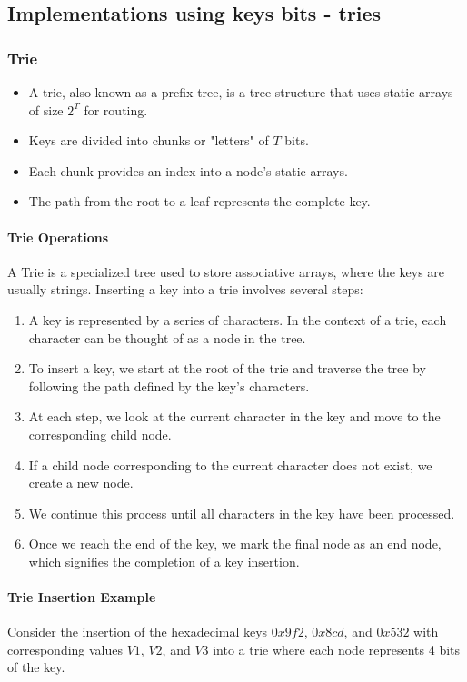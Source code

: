 \documentclass[12pt]{article}
\begin{document}
\subsection{Implementations using keys bits - tries}

\subsubsection{Trie}

\begin{itemize}
    \item A trie, also known as a prefix tree, is a tree structure that uses static arrays of size \(2^T\) for routing.
    \item Keys are divided into chunks or "letters" of \(T\) bits.
    \item Each chunk provides an index into a node's static arrays.
    \item The path from the root to a leaf represents the complete key.
\end{itemize}

\paragraph{Trie Operations}
A Trie is a specialized tree used to store associative arrays, where the keys are usually strings. Inserting a key into a trie involves several steps:
\begin{enumerate}
    \item A key is represented by a series of characters. In the context of a trie, each character can be thought of as a node in the tree.
    \item To insert a key, we start at the root of the trie and traverse the tree by following the path defined by the key's characters.
    \item At each step, we look at the current character in the key and move to the corresponding child node.
    \item If a child node corresponding to the current character does not exist, we create a new node.
    \item We continue this process until all characters in the key have been processed.
    \item Once we reach the end of the key, we mark the final node as an end node, which signifies the completion of a key insertion.
\end{enumerate}


\paragraph{Trie Insertion Example}
Consider the insertion of the hexadecimal keys \(0x9f2\), \(0x8cd\), and \(0x532\) with corresponding values \(V1\), \(V2\), and \(V3\) into a trie where each node represents 4 bits of the key.
\end{document}
